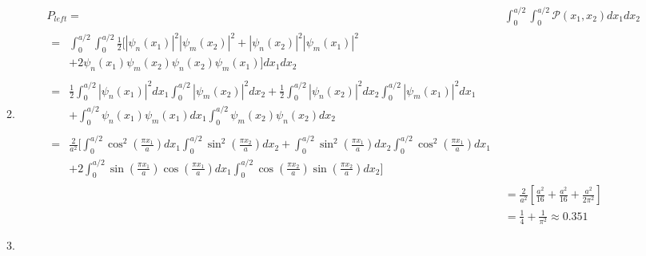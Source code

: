 \documentclass[10pt]{article}
\begin{document}
\begin{enumerate}
\begin{enumerate}
\begin{align*}
    \end{align*}
  \item
    \begin{align*}
      P_{left} ={}& \int_{0}^{a / 2} \int_{0}^{a / 2} \mathcal{P} \left( x_1,x_2 \right) d x_1 d x_2 \\
      \begin{split} 
        ={}& \int_{0}^{a / 2} \int_{0}^{a / 2} \frac{1}{2} \bigl[ \left|\psi_n \left( x_1 \right) \right| ^2 \left| \psi_m \left( x_2 \right) \right| ^2 + \left| \psi_n \left( x_2 \right) \right| ^2 \left| \psi_m \left( x_1 \right) \right| ^2 \\
        & + 2 \psi_n \left( x_1 \right) \psi_m \left( x_2 \right) \psi_n \left( x_2 \right) \psi_m \left( x_1 \right) \bigr] d x_1 d x_2
      \end{split}\\
      \begin{split} 
        ={}& \frac{1}{2} \int_{0}^{a / 2} \left|\psi_n \left( x_1 \right) \right| ^2 d x_1 \int_{0}^{a / 2} \left| \psi_m \left( x_2 \right) \right| ^2 d x_2 + \frac{1}{2} \int_{0}^{a / 2} \left| \psi_n \left( x_2 \right) \right| ^2 d x_2 \int_{0}^{a / 2} \left| \psi_m \left( x_1 \right) \right| ^2 d x_1 \\
        & + \int_{0}^{a / 2} \psi_n \left( x_1 \right) \psi_m \left( x_1 \right)  d x_1 \int_{0}^{a / 2} \psi_m \left( x_2 \right) \psi_n \left( x_2 \right)  d x_2
      \end{split} \\
      \begin{split} 
        ={}& \frac{2}{a^2} \bigl[ \int_{0}^{a / 2} \cos^2 \left( \frac{\pi x_1}{a} \right) d x_1 \int_{0}^{a / 2} \sin^2 \left( \frac{\pi x_2}{a} \right) d x_2 +  \int_{0}^{a / 2} \sin ^2 \left( \frac{\pi x_1}{a} \right) d x_2 \int_{0}^{a / 2} \cos ^2 \left( \frac{\pi x_1}{a} \right) d x_1 \\
           & + 2 \int_{0}^{a / 2} \sin \left( \frac{\pi x_1}{a} \right) \cos \left( \frac{\pi x_1}{a} \right) d x_1 \int_{0}^{a / 2} \cos \left( \frac{\pi x_2}{a} \right) \sin \left( \frac{\pi x_2}{a} \right)  d x_2 \bigr]
      \end{split} \\
                  &= \frac{2}{a^2} \left[ \frac{a^2}{16} + \frac{a^2}{16} + \frac{a^2}{2\pi^2} \right] \\
                  &= \frac{1}{4} + \frac{1}{\pi^2} \approx \num{0,351}
    \end{align*}
  \item 

\end{enumerate}
\end{enumerate}
\end{document}

